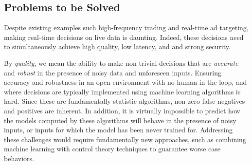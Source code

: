 \documentclass [10pt]{article}
\begin{document}
\begin{outline}



\subsection{Problems to be Solved}

Despite existing examples such high-frequency trading and real-time ad targeting, making real-time decisions on live data is daunting. Indeed, these decisions need to simultaneously achieve high quality, low latency, and and strong security. 

By {\em quality}, we mean the ability to make non-trivial decisions that are {\em accurate} and {\em robust} in the presence of noisy data and unforeseen inputs. Ensuring accuracy and robustness in an open environment with no human in the loop, and where decisions are typically implemented using machine learning algorithms is hard. Since these are fundamentally statistic algorithms, non-zero false negatives and positives are inherent. In addition,  it is virtually impossible to predict how the models computed by these  algorithms will behave in the presence of noisy inputs, or inputs for which the model has been never trained for. Addressing these challenges would require fundamentally new approaches, such as combining machine learning with control theory techniques to guarantee worse case behaviors.


\end{outline}
\end{document}
